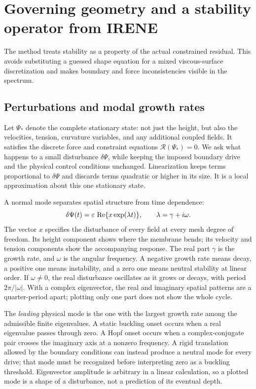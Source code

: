 \section{Governing geometry and a stability operator from IRENE}\label{sec:operator}
The method treats stability as a property of the actual constrained residual. This avoids substituting a guessed shape equation for a mixed viscous-surface discretization and makes boundary and force inconsistencies visible in the spectrum.


\subsection{Perturbations and modal growth rates}
Let $\Psi_*$ denote the complete stationary state: not just the height, but also the velocities, tension, curvature variables, and any additional coupled fields. It satisfies the discrete force and constraint equations $\mathcal R(\Psi_*)=0$. We ask what happens to a small disturbance $\delta\Psi$, while keeping the imposed boundary drive and the physical control conditions unchanged. Linearization keeps terms proportional to $\delta\Psi$ and discards terms quadratic or higher in its size. It is a local approximation about this one stationary state.

A normal mode separates spatial structure from time dependence:
\begin{equation}
\delta\Psi(t)=\varepsilon\,\operatorname{Re}\{x\exp(\lambda t)\},\qquad
\lambda=\gamma+i\omega.
\label{eq:reading-mode}
\end{equation}
The vector $x$ specifies the disturbance of every field at every mesh degree of freedom. Its height component shows where the membrane bends; its velocity and tension components show the accompanying response. The real part $\gamma$ is the growth rate, and $\omega$ is the angular frequency. A negative growth rate means decay, a positive one means instability, and a zero one means neutral stability at linear order. If $\omega\ne0$, the real disturbance oscillates as it grows or decays, with period $2\pi/|\omega|$. With a complex eigenvector, the real and imaginary spatial patterns are a quarter-period apart; plotting only one part does not show the whole cycle.

The \emph{leading} physical mode is the one with the largest growth rate among the admissible finite eigenvalues. A static buckling onset occurs when a real eigenvalue passes through zero. A Hopf onset occurs when a complex-conjugate pair crosses the imaginary axis at a nonzero frequency. A rigid translation allowed by the boundary conditions can instead produce a neutral mode for every drive; that mode must be recognized before interpreting zero as a buckling threshold. Eigenvector amplitude is arbitrary in a linear calculation, so a plotted mode is a shape of a disturbance, not a prediction of its eventual depth.

